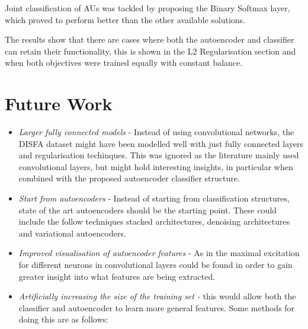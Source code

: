     Joint classification of AUs was tackled by proposing the Binary Softmax layer,
    which proved to perform better than the other available solutions.

    The results show that there are cases where both the autoencoder
    and classifier can retain their functionality,
    this is shown in the L2 Regularisation section
    and when both objectives were trained
    equally with constant balance.



  \section{Future Work}





    \begin{itemize}
      \item \textit{Larger fully connected models} - Instead of using convolutional networks, the DISFA dataset might have been
                                                     modelled well with just fully connected layers and regularisation techinques.
                                                     This was ignored as the literature mainly used convolutional layers, but might hold
                                                     interesting insights, in particular when combined with the proposed autoencoder classifier structure.
      \item \textit{Start from autoencoders} -
            Instead of starting from classification structures, state of the art autoencoders
            should be the starting point. These could include the follow techniques stacked architectures\cite{Zhou2014}, denoising architectures\cite{stacks,Vincent2008a} and variational autoencoders\cite{Kingma2013}.
      \item \textit{Improved visualisation of autoencoder features} - As in \cite{Khorrami2015} the maximal excitation for different neurons in convolutional layers
              could be found in order to gain greater insight into what features are being extracted.
      \item \textit{  Artificially increasing the size of the training set -}
            this would allow both the classifier and autoencoder to learn more
            general features. Some methods for doing this are as follows:


\end{itemize}
